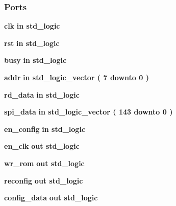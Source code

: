 \subsubsection*{Ports}
 \begin{DoxyCompactItemize}
\item 
{\bf clk}  {\bfseries {\bfseries \textcolor{keywordflow}{in}\textcolor{vhdlchar}{ }}} {\bfseries \textcolor{comment}{std\+\_\+logic}\textcolor{vhdlchar}{ }} 
\item 
{\bf rst}  {\bfseries {\bfseries \textcolor{keywordflow}{in}\textcolor{vhdlchar}{ }}} {\bfseries \textcolor{comment}{std\+\_\+logic}\textcolor{vhdlchar}{ }} 
\item 
{\bf busy}  {\bfseries {\bfseries \textcolor{keywordflow}{in}\textcolor{vhdlchar}{ }}} {\bfseries \textcolor{comment}{std\+\_\+logic}\textcolor{vhdlchar}{ }} 
\item 
{\bf addr}  {\bfseries {\bfseries \textcolor{keywordflow}{in}\textcolor{vhdlchar}{ }}} {\bfseries \textcolor{comment}{std\+\_\+logic\+\_\+vector}\textcolor{vhdlchar}{ }\textcolor{vhdlchar}{(}\textcolor{vhdlchar}{ }\textcolor{vhdlchar}{ } \textcolor{vhdldigit}{7} \textcolor{vhdlchar}{ }\textcolor{keywordflow}{downto}\textcolor{vhdlchar}{ }\textcolor{vhdlchar}{ } \textcolor{vhdldigit}{0} \textcolor{vhdlchar}{ }\textcolor{vhdlchar}{)}\textcolor{vhdlchar}{ }} 
\item 
{\bf rd\+\_\+data}  {\bfseries {\bfseries \textcolor{keywordflow}{in}\textcolor{vhdlchar}{ }}} {\bfseries \textcolor{comment}{std\+\_\+logic}\textcolor{vhdlchar}{ }} 
\item 
{\bf spi\+\_\+data}  {\bfseries {\bfseries \textcolor{keywordflow}{in}\textcolor{vhdlchar}{ }}} {\bfseries \textcolor{comment}{std\+\_\+logic\+\_\+vector}\textcolor{vhdlchar}{ }\textcolor{vhdlchar}{(}\textcolor{vhdlchar}{ }\textcolor{vhdlchar}{ } \textcolor{vhdldigit}{143} \textcolor{vhdlchar}{ }\textcolor{keywordflow}{downto}\textcolor{vhdlchar}{ }\textcolor{vhdlchar}{ } \textcolor{vhdldigit}{0} \textcolor{vhdlchar}{ }\textcolor{vhdlchar}{)}\textcolor{vhdlchar}{ }} 
\item 
{\bf en\+\_\+config}  {\bfseries {\bfseries \textcolor{keywordflow}{in}\textcolor{vhdlchar}{ }}} {\bfseries \textcolor{comment}{std\+\_\+logic}\textcolor{vhdlchar}{ }} 
\item 
{\bf en\+\_\+clk}  {\bfseries {\bfseries \textcolor{keywordflow}{out}\textcolor{vhdlchar}{ }}} {\bfseries \textcolor{comment}{std\+\_\+logic}\textcolor{vhdlchar}{ }} 
\item 
{\bf wr\+\_\+rom}  {\bfseries {\bfseries \textcolor{keywordflow}{out}\textcolor{vhdlchar}{ }}} {\bfseries \textcolor{comment}{std\+\_\+logic}\textcolor{vhdlchar}{ }} 
\item 
{\bf reconfig}  {\bfseries {\bfseries \textcolor{keywordflow}{out}\textcolor{vhdlchar}{ }}} {\bfseries \textcolor{comment}{std\+\_\+logic}\textcolor{vhdlchar}{ }} 
\item 
{\bf config\+\_\+data}  {\bfseries {\bfseries \textcolor{keywordflow}{out}\textcolor{vhdlchar}{ }}} {\bfseries \textcolor{comment}{std\+\_\+logic}\textcolor{vhdlchar}{ }} 
\end{DoxyCompactItemize}


